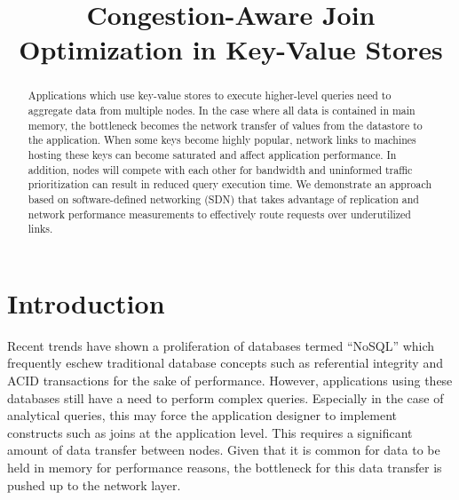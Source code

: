 \documentclass{sig-alternate-2013}
\begin{document}
\hypersetup{pdftitle=Congestion-Aware Join Optimization in Key-Value Stores}

\title{Congestion-Aware Join Optimization in Key-Value Stores}

\author{
}

\maketitle

\begin{abstract}
Applications which use key-value stores to execute higher-level queries need to aggregate data from multiple nodes.
In the case where all data is contained in main memory, the bottleneck becomes the network transfer of values from the datastore to the application.
When some keys become highly popular, network links to machines hosting these keys can become saturated and affect application performance.
In addition, nodes will compete with each other for bandwidth and uninformed traffic prioritization can result in reduced query execution time.
We demonstrate an approach based on software-defined networking (SDN) that takes advantage of replication and network performance measurements to effectively route requests over underutilized links.
\end{abstract}

\section{Introduction}

Recent trends have shown a proliferation of databases termed ``NoSQL'' which frequently eschew traditional database concepts such as referential integrity and ACID transactions for the sake of performance.
However, applications using these databases still have a need to perform complex queries.
Especially in the case of analytical queries, this may force the application designer to implement constructs such as joins at the application level.
This requires a significant amount of data transfer between nodes.
Given that it is common for data to be held in memory for performance reasons, the bottleneck for this data transfer is pushed up to the network layer.
\end{document}
